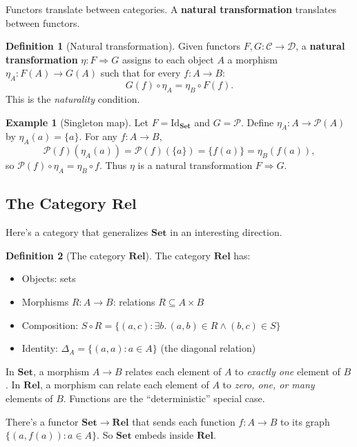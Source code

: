 \documentclass[11pt]{article}
\newcommand{\Pow}{\mathcal{P}}
\newcommand{\cat}[1]{\mathbf{#1}}
\newcommand{\Set}{\cat{Set}}
\newcommand{\Rel}{\cat{Rel}}
\theoremstyle{definition}
\newtheorem{definition}{Definition}[section]
\newtheorem{example}{Example}[section]
\theoremstyle{plain}
\theoremstyle{remark}
\begin{document}
Functors translate between categories. A \textbf{natural transformation} translates between functors.

\begin{definition}[Natural transformation]
Given functors $F, G: \mathcal{C} \to \mathcal{D}$, a \textbf{natural transformation} $\eta: F \Rightarrow G$ assigns to each object $A$ a morphism $\eta_A: F(A) \to G(A)$ such that for every $f: A \to B$:
\[
G(f) \circ \eta_A = \eta_B \circ F(f).
\]
This is the \emph{naturality} condition.
\end{definition}

\begin{example}[Singleton map]
Let $F = \mathrm{Id}_{\Set}$ and $G = \Pow$. Define $\eta_A: A \to \Pow(A)$ by $\eta_A(a) = \{a\}$.
For any $f: A \to B$,
\[
\Pow(f)(\eta_A(a)) = \Pow(f)(\{a\}) = \{f(a)\} = \eta_B(f(a)),
\]
so $\Pow(f) \circ \eta_A = \eta_B \circ f$. Thus $\eta$ is a natural transformation $F \Rightarrow G$.
\end{example}

\subsection{The Category \texorpdfstring{$\Rel$}{Rel}}

Here's a category that generalizes $\Set$ in an interesting direction.

\begin{definition}[The category $\Rel$]
The category $\Rel$ has:
\begin{itemize}
  \item Objects: sets
  \item Morphisms $R: A \to B$: relations $R \subseteq A \times B$
  \item Composition: $S \circ R = \{(a, c) : \exists b.\, (a, b) \in R \land (b, c) \in S\}$
  \item Identity: $\Delta_A = \{(a, a) : a \in A\}$ (the diagonal relation)
\end{itemize}
\end{definition}

In $\Set$, a morphism $A \to B$ relates each element of $A$ to \emph{exactly one} element of $B$. In $\Rel$, a morphism can relate each element of $A$ to \emph{zero, one, or many} elements of $B$. Functions are the ``deterministic'' special case.

There's a functor $\Set \to \Rel$ that sends each function $f: A \to B$ to its graph $\{(a, f(a)) : a \in A\}$. So $\Set$ embeds inside $\Rel$.
\end{document}

